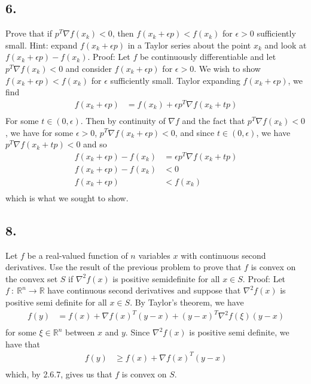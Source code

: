 \documentclass{article}
\begin{document}
\subsection*{6.} Prove that if $p^T\nabla f(x_k) < 0$, then $f(x_k + \epsilon p) < f(x_k)$ for $\epsilon > 0$ sufficiently small. Hint: expand $f(x_k + \epsilon p)$ in a Taylor series about the point $x_k$ and look at $f(x_k + \epsilon p) - f(x_k)$.
\newline\newline
Proof: Let $f$ be continuously differentiable and let $p^T\nabla f(x_k) < 0$ and consider $f(x_k + \epsilon p)$ for $\epsilon > 0$. We wish to show $f(x_k + \epsilon p) < f(x_k)$ for $\epsilon$ sufficiently small. Taylor expanding $f(x_k + \epsilon p)$, we find
\begin{align*}
    f(x_k + \epsilon p) &= f(x_k) + \epsilon p^T\nabla f(x_k + tp) \\
\end{align*}
For some $t \in (0, \epsilon)$. Then by continuity of $\nabla f$ and the fact that $p^T\nabla f(x_k) < 0$, we have for some $\epsilon > 0$, $p^T\nabla f(x_k + \epsilon p) < 0$, and since $t \in (0, \epsilon)$, we have $p^T\nabla f(x_k + tp) < 0$ and so
\begin{align*}
    f(x_k + \epsilon p) - f(x_k) &= \epsilon p^T\nabla f(x_k + tp) \\
    f(x_k + \epsilon p) - f(x_k) &< 0 \\
    f(x_k + \epsilon p) &< f(x_k) \\
\end{align*}
which is what we sought to show.

\subsection*{8.} Let $f$ be a real-valued function of $n$ variables $x$ with continuous second derivatives. Use the result of the previous problem to prove that $f$ is convex on the convex set $S$ if $\nabla^2f(x)$ is positive semidefinite for all $x \in S$.
\newline\newline
Proof: Let $f \: : \: \mathbb{R}^n \to \mathbb{R}$ have continuous second derivatives and suppose that $\nabla^2f(x)$ is positive semi definite for all $x \in S$. By Taylor's theorem, we have
\begin{align*}
    f(y) &= f(x) + \nabla f(x)^T(y-x) + (y-x)^T\nabla^2f(\xi)(y-x) \\
\end{align*}
for some $\xi\in \mathbb{R}^n$ between $x$ and $y$. Since $\nabla^2f(x)$ is positive semi definite, we have that
\begin{align*}
    f(y) &\geq f(x) + \nabla f(x)^T(y-x) \\
\end{align*}
which, by 2.6.7, gives us that $f$ is convex on $S$.
\end{document}
